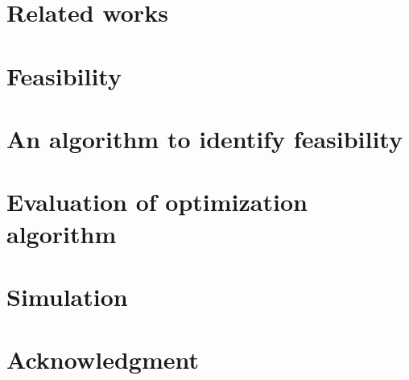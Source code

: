 \documentclass[conference]{IEEEtran}
\begin{document}
\section{Related works}\label{Sec3}

\section{Feasibility}\label{Sec4}

\section{An algorithm to identify feasibility}\label{Sec5}

\section{Evaluation of optimization algorithm}\label{Sec6}

\section{Simulation}\label{Sec7}

\section*{Acknowledgment}



\renewcommand\refname{Reference}



\end{document}
